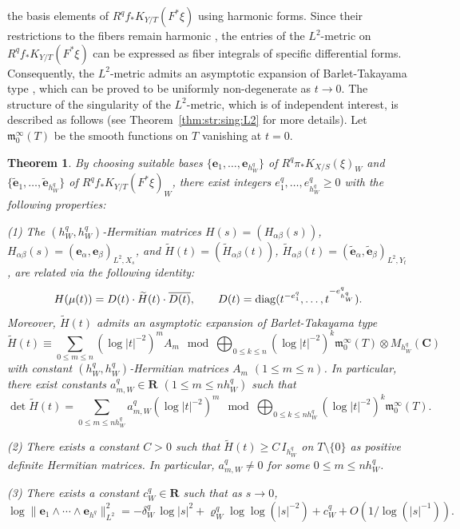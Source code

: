 \documentclass[amscd, leqno]{amsart}
\theoremstyle{plain}
\newtheorem{theorem}{Theorem}[section]
\theoremstyle{definition}
\theoremstyle{remark}
\begin{document}
the basis elements of $R^{q}f_{*}K_{Y/T}(F^{*}\xi)$ using harmonic forms. Since their restrictions to the fibers remain harmonic
\cite{MourouganeTakayama08}, the entries of the $L^{2}$-metric on $R^{q}f_{*}K_{Y/T}(F^{*}\xi)$ can be expressed as fiber integrals 
of specific differential forms. 
Consequently, the $L^{2}$-metric admits an asymptotic expansion of Barlet-Takayama type \cite{Barlet82, Takayama21, Takayama22}, 
which can be proved to be uniformly non-degenerate as $t \to 0$. 
The structure of the singularity of the $L^{2}$-metric, which is of independent interest, is described as follows 
(see Theorem~\ref{thm:str:sing:L2} for more details). 
Let ${\mathfrak m}^{\infty}_{0}(T)$ be the smooth functions on $T$ vanishing at $t=0$.


\begin{theorem}
\label{Mthm:Sing:L2}
By choosing suitable bases $\{ {\mathbf e}_{1},\ldots,{\mathbf e}_{h_{W}^{q}} \}$ of $R^{q}\pi_{*}K_{X/S}(\xi)_{W}$
and $\{ \widetilde{\mathbf e}_{1}, \ldots, \widetilde{\mathbf e}_{h_{W}^{q}}\}$ of $R^{q}f_{*}K_{Y/T}(F^{*}\xi)_{W}$,
there exist integers $e^{q}_{1},\ldots, e^{q}_{h_{W}^{q}} \geq0$ with the following properties:
\par{\rm (1)}
The $(h_{W}^{q}, h_{W}^{q})$-Hermitian matrices $H(s) = ( H_{\alpha\beta}(s) )$, 
$H_{\alpha\beta}(s) = ( {\mathbf e}_{\alpha} , {\mathbf e}_{\beta} )_{L^{2},X_{s}}$, and 
$\widetilde{H}(t) = ( \widetilde{H}_{\alpha\beta}(t) )$, 
$\widetilde{H}_{\alpha\beta}(t) = ( \widetilde{\mathbf e}_{\alpha} , \widetilde{\mathbf e}_{\beta} )_{L^{2},Y_{t}}$, 
are related via the following identity:
$$
H(\mu(t)) = D(t)\cdot \widetilde{H}(t)\cdot\overline{D(t)},
\qquad
D(t) = {\rm diag}( t^{-e^{q}_{1}},\ldots,t^{-e^{q}_{h_{W}^{q}}} ).
$$
Moreover, $\widetilde{H}(t)$ admits an asymptotic expansion of Barlet-Takayama type
$$
\widetilde{H}(t) \equiv \sum_{0\leq m \leq n} (\log |t|^{-2})^{m} A_{m} 
\mod \bigoplus_{0\leq k \leq n} (\log |t|^{-2})^{k} {\mathfrak m}^{\infty}_{0}(T) \otimes M_{h_{W}^{q}}( {\mathbf C} )
$$
with constant $(h_{W}^{q}, h_{W}^{q})$-Hermitian matrices $A_{m}$ $(1\leq m \leq n)$. 
In particular, there exist constants $a_{m,W}^{q} \in {\mathbf R}$ $( 1 \leq m \leq nh_{W}^{q})$ such that 
$$
\det \widetilde{H}(t) = \sum_{0 \leq m \leq nh_{W}^{q}} a_{m,W}^{q} (\log |t|^{-2})^{m} 
\mod \bigoplus_{0\leq k \leq nh_{W}^{q}} (\log |t|^{-2})^{k} {\mathfrak m}^{\infty}_{0}(T).
$$
\par{\rm (2)}
There exists a constant $C>0$ such that $\widetilde{H}(t) \geq C\,I_{h_{W}^{q}}$ on $T\setminus\{0\}$ as positive definite Hermitian matrices.
In particular, $a_{m,W}^{q} \not=0$ for some $0 \leq m \leq nh_{W}^{q}$.
\par{\rm (3)}
There exists a constant $c_{W}^{q} \in {\mathbf R}$ such that as $s\to 0$,
$$
\log\| {\mathbf e}_{1}\wedge \cdots\wedge {\mathbf e}_{h^{q}} \|_{L^{2}}^{2} 
= -\delta_{W}^{q}\,\log |s|^{2} + \varrho_{W}^{q}\log\log(|s|^{-2}) + c_{W}^{q} + O\left(1/\log (|s|^{-1}) \right).
$$
\end{theorem}
\end{document}
